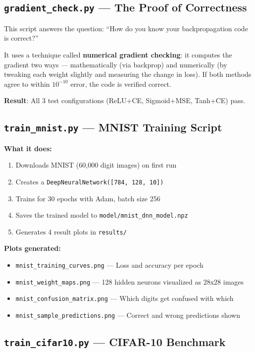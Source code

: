 \documentclass[12pt, a4paper]{article}
\begin{document}
\subsection{\texttt{gradient\_check.py} --- The Proof of Correctness}

This script answers the question: ``How do you know your backpropagation code is correct?''

It uses a technique called \textbf{numerical gradient checking}: it computes the gradient two ways --- mathematically (via backprop) and numerically (by tweaking each weight slightly and measuring the change in loss). If both methods agree to within $10^{-10}$ error, the code is verified correct.

\textbf{Result}: All 3 test configurations (ReLU+CE, Sigmoid+MSE, Tanh+CE) pass.

\subsection{\texttt{train\_mnist.py} --- MNIST Training Script}

\textbf{What it does:}
\begin{enumerate}
  \item Downloads MNIST (60,000 digit images) on first run
  \item Creates a \texttt{DeepNeuralNetwork([784, 128, 10])}
  \item Trains for 30 epochs with Adam, batch size 256
  \item Saves the trained model to \texttt{model/mnist\_dnn\_model.npz}
  \item Generates 4 result plots in \texttt{results/}
\end{enumerate}

\textbf{Plots generated:}
\begin{itemize}
  \item \texttt{mnist\_training\_curves.png} --- Loss and accuracy per epoch
  \item \texttt{mnist\_weight\_maps.png} --- 128 hidden neurons visualized as 28x28 images
  \item \texttt{mnist\_confusion\_matrix.png} --- Which digits get confused with which
  \item \texttt{mnist\_sample\_predictions.png} --- Correct and wrong predictions shown
\end{itemize}

\subsection{\texttt{train\_cifar10.py} --- CIFAR-10 Benchmark}
\end{document}
